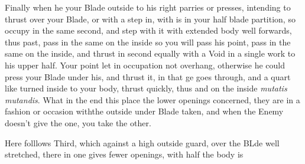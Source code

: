 Finally when he your Blade outside to his right parries or presses,
intending to thrust over your Blade, or with a step in, with is in
your half blade partition, so occupy in the same second, and step with
it with extended body well forwards, thus past, pass in the same on
the inside so you will pass his point, pass in the same on the inside,
and thrust in second equally with a Void in a single work to his upper
half. Your point let in occupation not overhang, otherwise he could
press your Blade under his, and thrust it, in that ge goes through,
and a quart like turned inside to your body, thrust quickly, thus and
on the inside {\it mutatis mutandis}. What in the end this place the lower
openings concerned, they are in a fashion or occasion withthe outside
under Blade taken, and when the Enemy doesn't give the one, you take
the other.


Here folllows Third, which against a high outside guard, over the BLde
well stretched, there in one gives fewer openings, with half the body is
